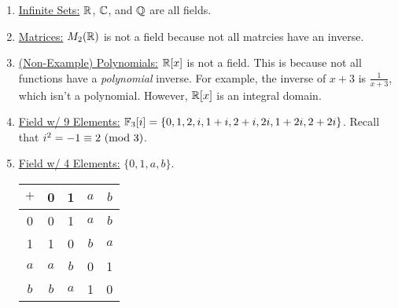 \documentclass[letterpaper]{article}
\begin{document}
\begin{enumerate}
    \item \underline{Infinite Sets:} $\mathbb{R}$, $\mathbb{C}$, and $\mathbb{Q}$ are all fields. 
    \item \underline{Matrices:} $M_{2}(\mathbb{R})$ is not a field because not all matrcies have an inverse. 
    \item \underline{(Non-Example) Polynomials:} $\mathbb{R}[x]$ is not a field. This is because not all functions have a \emph{polynomial} inverse. For example, the inverse of $x + 3$ is $\frac{1}{x + 3}$, which isn't a polynomial. However, $\mathbb{R}[x]$ is an integral domain. 
    \item \underline{Field w/ 9 Elements:} $\mathbb{F}_{3}[i] = \{0, 1, 2, i, 1 + i, 2 + i, 2i, 1 + 2i, 2 + 2i\}$. Recall that $i^2 = -1 \equiv 2 \ (\mathrm{mod}\ 3)$. 
    \item \underline{Field w/ 4 Elements:} $\{0, 1, a, b\}$. 
    \begin{center}
        \begin{tabular}{c|c c c c}
            $+$ & 0 & 1 & $a$ & $b$ \\  
            \hline 
            0   & 0 & 1 & $a$ & $b$ \\ 
            1   & 1 & 0 & $b$ & $a$ \\
            $a$ & $a$ & $b$ & 0 & 1 \\ 
            $b$ & $b$ & $a$ & 1 & 0
        \end{tabular}


\end{center}
\end{enumerate}
\end{document}
